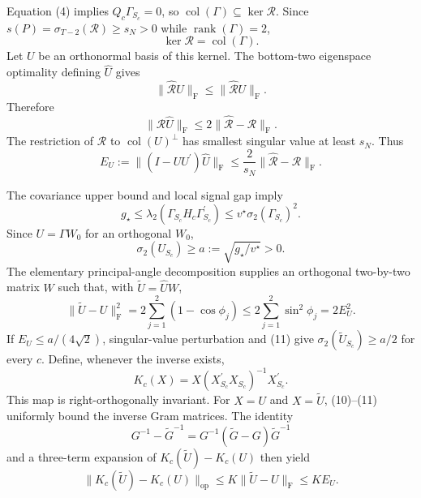 Equation (4) implies \(Q_c\Gamma_{S_c}=0\), so \(\operatorname{col}(\Gamma)\subseteq\ker\mathcal R\). Since \(s(P)=\sigma_{T-2}(\mathcal R)\geq s_N>0\) while \(\operatorname{rank}(\Gamma)=2\),
\[
\ker\mathcal R=\operatorname{col}(\Gamma).
\tag{8}
\]
Let \(U\) be an orthonormal basis of this kernel. The bottom-two eigenspace optimality defining \(\widehat U\) gives
\[
\|\widehat{\mathcal R}\widehat U\|_{\mathrm F}
\leq\|\widehat{\mathcal R}U\|_{\mathrm F}.
\]
Therefore
\[
\|\mathcal R\widehat U\|_{\mathrm F}
\leq2\|\widehat{\mathcal R}-\mathcal R\|_{\mathrm F}.
\]
The restriction of \(\mathcal R\) to \(\operatorname{col}(U)^\perp\) has smallest singular value at least \(s_N\). Thus
\[
E_U:=\|(I-UU^{\prime})\widehat U\|_{\mathrm F}
\leq\frac{2}{s_N}\|\widehat{\mathcal R}-\mathcal R\|_{\mathrm F}.
\tag{9}
\]

The covariance upper bound and local signal gap imply
\[
g_\star
\leq\lambda_2(\Gamma_{S_c}H_c\Gamma_{S_c}^{\prime})
\leq v^{\star}\sigma_2(\Gamma_{S_c})^2.
\]
Since \(U=\Gamma W_0\) for an orthogonal \(W_0\),
\[
\sigma_2(U_{S_c})\geq a:=\sqrt{g_\star/v^{\star}}>0.
\tag{10}
\]
The elementary principal-angle decomposition supplies an orthogonal two-by-two matrix \(W\) such that, with \(\widetilde U=\widehat UW\),
\[
\|\widetilde U-U\|_{\mathrm F}^2
=2\sum_{j=1}^2(1-\cos\phi_j)
\leq2\sum_{j=1}^2\sin^2\phi_j
=2E_U^2.
\tag{11}
\]
If \(E_U\leq a/(4\sqrt2)\), singular-value perturbation and (11) give \(\sigma_2(\widetilde U_{S_c})\geq a/2\) for every \(c\). Define, whenever the inverse exists,
\[
K_c(X)=X(X_{S_c}^{\prime}X_{S_c})^{-1}X_{S_c}^{\prime}.
\]
This map is right-orthogonally invariant. For \(X=U\) and \(X=\widetilde U\), (10)--(11) uniformly bound the inverse Gram matrices. The identity
\[
G^{-1}-\widetilde G^{-1}=G^{-1}(\widetilde G-G)\widetilde G^{-1}
\]
and a three-term expansion of \(K_c(\widetilde U)-K_c(U)\) then yield
\[
\|K_c(\widetilde U)-K_c(U)\|_{\mathrm{op}}
\leq K\|\widetilde U-U\|_{\mathrm F}
\leq KE_U.
\tag{12}
\]

